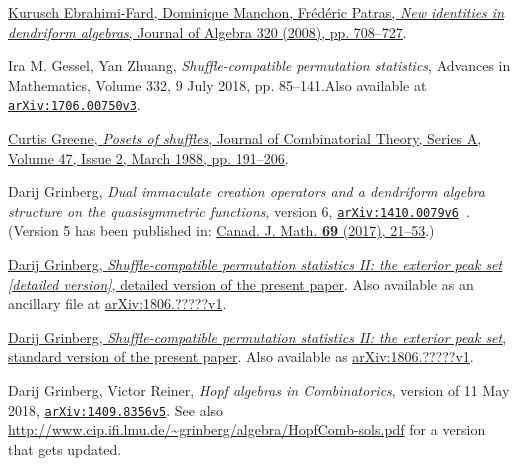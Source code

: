 \documentclass[numbers=enddot,12pt,final,onecolumn,notitlepage]{scrartcl}%
\theoremstyle{definition}
\newenvironment{verlong}{}{}
\newenvironment{vershort}{}{}
\begin{document}
\begin{thebibliography}{99999999}                                                                                         %


%
\href{https://doi.org/10.1016/j.jalgebra.2007.12.013}{Kurusch Ebrahimi-Fard,
Dominique Manchon, Fr\'{e}d\'{e}ric Patras, \textit{New identities in
dendriform algebras}, Journal of Algebra 320 (2008), pp. 708--727}.

Ira M. Gessel, Yan Zhuang, \textit{Shuffle-compatible
permutation statistics}, Advances in Mathematics, Volume 332, 9 July 2018, pp.
85--141.\newline Also available at
\texttt{\href{http://arxiv.org/abs/1706.00750v3}{arXiv:1706.00750v3}}.

%
\href{https://doi.org/10.1016/0097-3165(88)90018-0}{Curtis Greene,
\textit{Posets of shuffles}, Journal of Combinatorial Theory, Series A, Volume
47, Issue 2, March 1988, pp. 191--206}.

Darij Grinberg, \textit{Dual immaculate creation
operators and a dendriform algebra structure on the quasisymmetric functions},
version 6, \texttt{\href{https://arxiv.org/abs/1410.0079v6}{arXiv:1410.0079v6}%
}. (Version 5 has been published in:
\href{https://cms.math.ca/10.4153/CJM-2016-018-8?abfmt=ltx}{Canad. J. Math.
\textbf{69} (2017), 21--53}.)

\begin{vershort}


%
\href{http://www.cip.ifi.lmu.de/~grinberg/algebra/gzshuf2-long.pdf}{Darij
Grinberg, \textit{Shuffle-compatible permutation statistics II: the exterior
peak set [detailed version]}, detailed version of the present paper}. Also
available as an ancillary file at
\href{https://arxiv.org/abs/1806.?????v1}{arXiv:1806.?????v1}.
\end{vershort}

\begin{verlong}


%
\href{http://www.cip.ifi.lmu.de/~grinberg/algebra/gzshuf2.pdf}{Darij Grinberg,
\textit{Shuffle-compatible permutation statistics II: the exterior peak set},
standard version of the present paper}. Also available as
\href{https://arxiv.org/abs/1806.?????v1}{arXiv:1806.?????v1}.
\end{verlong}

Darij Grinberg, Victor Reiner, \textit{Hopf
algebras in Combinatorics}, version of 11 May 2018,
\texttt{\href{http://www.arxiv.org/abs/1409.8356v5}{arXiv:1409.8356v5}}.
\newline See also
\url{http://www.cip.ifi.lmu.de/~grinberg/algebra/HopfComb-sols.pdf} for a
version that gets updated.


\end{thebibliography}
\end{document}
